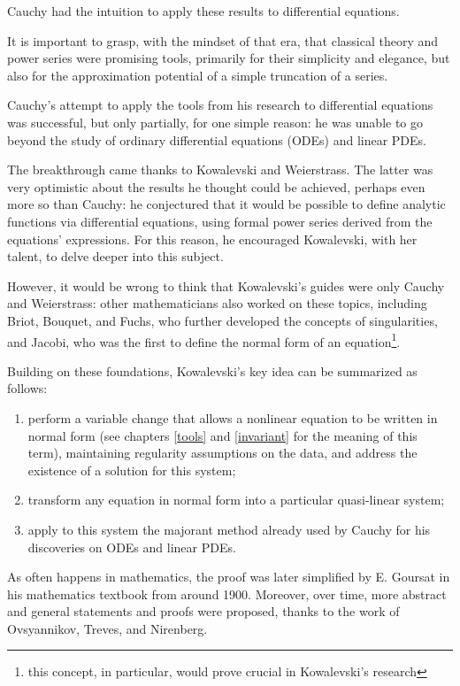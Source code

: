 Cauchy had the intuition to apply these results to differential equations.

It is important to grasp, with the mindset of that era, that classical theory and power series were promising tools, primarily for their simplicity and elegance, but also for the approximation potential of a simple truncation of a series.

Cauchy's attempt to apply the tools from his research to differential equations was successful, but only partially, for one simple reason: he was unable to go beyond the study of ordinary differential equations (ODEs) and linear PDEs.

The breakthrough came thanks to Kowalevski and Weierstrass. The latter was very optimistic about the results he thought could be achieved, perhaps even more so than Cauchy: he conjectured that it would be possible to define analytic functions via differential equations, using formal power series derived from the equations' expressions.
For this reason, he encouraged Kowalevski, with her talent, to delve deeper into this subject.

However, it would be wrong to think that Kowalevski's guides were only Cauchy and Weierstrass: other mathematicians also worked on these topics, including Briot, Bouquet, and Fuchs, who further developed the concepts of singularities, and Jacobi, who was the first to define the normal form of an equation\footnote{this concept, in particular, would prove crucial in Kowalevski's research}.

Building on these foundations, Kowalevski's key idea can be summarized as follows:
\begin{enumerate}
\item perform a variable change that allows a nonlinear equation to be written in normal form (see chapters \ref{tools} and \ref{invariant} for the meaning of this term), maintaining regularity assumptions on the data, and address the existence of a solution for this system;
\item transform any equation in normal form into a particular quasi-linear system;
\item apply to this system the majorant method already used by Cauchy for his discoveries on ODEs and linear PDEs.
\end{enumerate}

As often happens in mathematics, the proof was later simplified by E. Goursat in his mathematics textbook from around 1900. Moreover, over time, more abstract and general statements and proofs were proposed, thanks to the work of Ovsyannikov, Treves, and Nirenberg.

